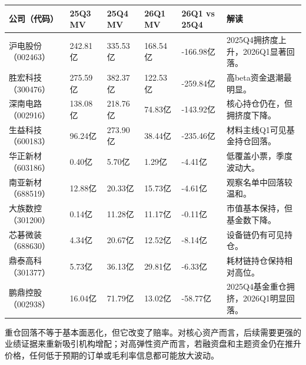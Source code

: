 \begin{exhibitbox}
\footnotesize
\begin{tabularx}{\textwidth}{L{1.8cm}R{1.7cm}R{1.7cm}R{1.7cm}R{1.7cm}X}
\toprule
\textbf{公司（代码）} & \textbf{25Q3 MV} & \textbf{25Q4 MV} & \textbf{26Q1 MV} & \textbf{26Q1 vs 25Q4} & \textbf{解读} \\
\midrule
沪电股份（002463） & 242.81亿 & 335.53亿 & 168.54亿 & -166.98亿 & 2025Q4拥挤度上升，2026Q1显著回落。 \\
胜宏科技（300476） & 275.59亿 & 382.37亿 & 122.53亿 & -259.84亿 & 高beta资金退潮最明显。 \\
深南电路（002916） & 138.08亿 & 218.76亿 & 74.83亿 & -143.92亿 & 核心持仓仍在，但拥挤度下降。 \\
生益科技（600183） & 96.24亿 & 273.90亿 & 38.44亿 & -235.46亿 & 材料主线Q1可见基金持仓回落。 \\
华正新材（603186） & 0.40亿 & 5.70亿 & 1.29亿 & -4.41亿 & 低覆盖小票，季度波动大。 \\
南亚新材（688519） & 12.88亿 & 20.33亿 & 15.73亿 & -4.61亿 & 观察名单中回落较温和。 \\
大族数控（301200） & 0.14亿 & 11.28亿 & 11.17亿 & -0.11亿 & 市值基本保持，但基金数下降。 \\
芯碁微装（688630） & 4.34亿 & 20.67亿 & 12.52亿 & -8.14亿 & 设备链仍有可见持仓。 \\
鼎泰高科（301377） & 5.73亿 & 36.13亿 & 29.81亿 & -6.33亿 & 耗材链持仓保持相对高位。 \\
鹏鼎控股（002938） & 16.04亿 & 71.79亿 & 13.02亿 & -58.77亿 & 2025Q4基金重仓拥挤，2026Q1明显回落。 \\
\bottomrule
\end{tabularx}
\end{exhibitbox}

重仓回落不等于基本面恶化，但它改变了赔率。对核心资产而言，后续需要更强的业绩证据来重新吸引机构增配；对高弹性资产而言，若融资盘和主题资金仍在推升价格，任何低于预期的订单或毛利率信息都可能放大波动。

